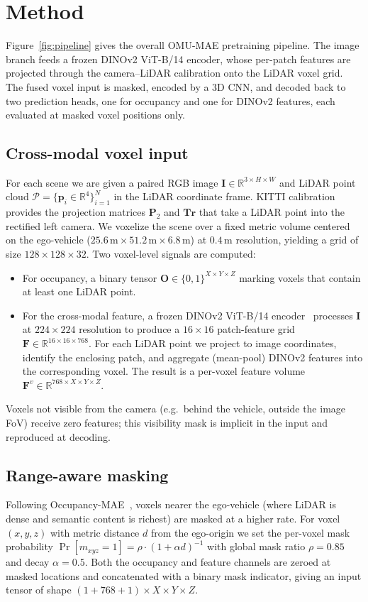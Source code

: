 \section{Method}
\label{sec:method}



Figure~\ref{fig:pipeline} gives the overall OMU-MAE pretraining pipeline.
The image branch feeds a frozen DINOv2 ViT-B/14 encoder, whose per-patch
features are projected through the camera--LiDAR calibration onto the
LiDAR voxel grid. The fused voxel input is masked, encoded by a 3D CNN,
and decoded back to two prediction heads, one for occupancy and one for
DINOv2 features, each evaluated at masked voxel positions only.

\subsection{Cross-modal voxel input}
For each scene we are given a paired RGB image
$\mathbf{I}\in\mathbb{R}^{3\times H\times W}$ and LiDAR point cloud
$\mathcal{P}=\{\mathbf{p}_i\in\mathbb{R}^4\}_{i=1}^{N}$ in the LiDAR
coordinate frame. KITTI calibration provides the projection matrices
$\mathbf{P}_2$ and $\mathbf{Tr}$ that take a LiDAR point into the
rectified left camera. We voxelize the scene over a fixed metric volume
centered on the ego-vehicle ($25.6\,\text{m}\times51.2\,\text{m}\times6.8\,\text{m}$)
at $0.4$\,m resolution, yielding a grid of size
$128\times128\times32$. Two voxel-level signals are computed:
\begin{itemize}
\item For occupancy, a binary tensor
$\mathbf{O}\in\{0,1\}^{X\times Y\times Z}$ marking voxels that contain at
least one LiDAR point.
\item For the cross-modal feature, a frozen DINOv2 ViT-B/14
encoder~\cite{dinov2} processes $\mathbf{I}$ at $224\times224$ resolution
to produce a $16\times16$ patch-feature grid
$\mathbf{F}\in\mathbb{R}^{16\times16\times768}$. For each LiDAR point we
project to image coordinates, identify the enclosing patch, and aggregate
(mean-pool) DINOv2 features into the corresponding voxel. The result is a
per-voxel feature volume $\mathbf{F}^v\in\mathbb{R}^{768\times X\times Y\times Z}$.
\end{itemize}
Voxels not visible from the camera (e.g.\ behind the vehicle, outside the
image FoV) receive zero features; this visibility mask is implicit in the
input and reproduced at decoding.

\subsection{Range-aware masking}
Following Occupancy-MAE~\cite{occmae}, voxels nearer the ego-vehicle
(where LiDAR is dense and semantic content is richest) are masked at a
higher rate. For voxel $(x,y,z)$ with metric distance $d$ from the
ego-origin we set the per-voxel mask probability
$\Pr[m_{xyz}{=}1]=\rho\cdot(1+\alpha d)^{-1}$ with global mask ratio
$\rho=0.85$ and decay $\alpha=0.5$. Both the occupancy and feature
channels are zeroed at masked locations and concatenated with a binary
mask indicator, giving an input tensor of shape
$(1+768+1)\times X\times Y\times Z$.

